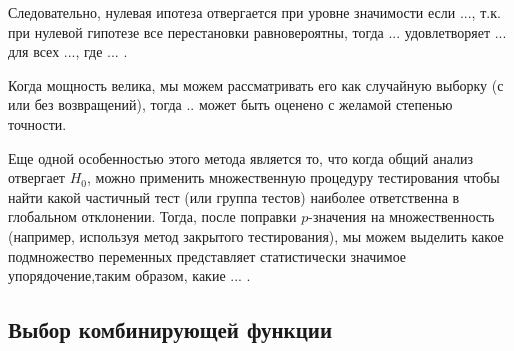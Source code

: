 \documentclass{article}
\begin{document}
Следовательно, нулевая ипотеза отвергается при уровне значимости если ..., т.к. при нулевой гипотезе все перестановки равновероятны, тогда ... удовлетворяет ... для всех ..., где ... .

Когда мощность велика, мы можем рассматривать его как случайную выборку (с или без возвращений), тогда .. может быть оценено с желамой степенью точности.

Еще одной особенностью этого метода является то, что когда общий анализ отвергает $H_0$, можно применить множественную процедуру тестирования чтобы найти какой частичный тест (или группа тестов) наиболее ответственна в глобальном отклонении. Тогда, после поправки $p$-значения на множественность (например, используя метод закрытого тестирования), мы можем выделить какое подмножество переменных представляет статистически значимое упорядочение,таким образом, какие ... .

\subsection{Выбор комбинирующей функции}
\end{document}

